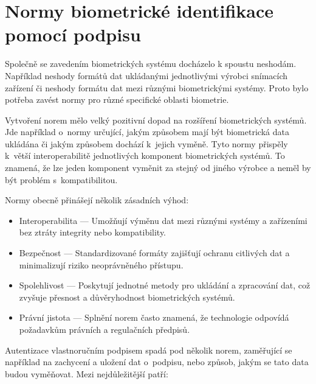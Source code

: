 \section{Normy biometrické identifikace pomocí podpisu}
Společně se zavedením biometrických systému docházelo k spoustu neshodám.
Například neshody formátů dat ukládanými jednotlivými výrobci snímacích zařízení či neshody formátu dat mezi různými biometrickými systémy.
Proto bylo potřeba zavést normy pro různé specifické oblasti biometrie.

Vytvoření norem mělo velký pozitivní dopad na rozšíření biometrických systémů.                                                %
Jde například o~normy určující, jakým způsobem mají být biometrická data ukládána či jakým způsobem dochází k~jejich vyměně.  %
Tyto normy přispěly k~větší interoperabilitě jednotlivých komponent biometrických systémů.                                    %
To znamená, že lze jeden komponent vyměnit za stejný od jiného výrobce a neměl by být problém s~kompatibilitou.~\cite{DrahanskýMartin2011}%
\newline 

\noindent
Normy obecně přinášejí několik zásadních výhod:
\begin{itemize}
  \item Interoperabilita --- Umožňují výměnu dat mezi různými systémy a zařízeními bez ztráty integrity nebo kompatibility.
  \item Bezpečnost --- Standardizované formáty zajišťují ochranu citlivých dat a minimalizují riziko neoprávněného přístupu.
  \item Spolehlivost --- Poskytují jednotné metody pro ukládání a zpracování dat, což zvyšuje přesnost a důvěryhodnost biometrických systémů.
  \item Právní jistota --- Splnění norem často znamená, že technologie odpovídá požadavkům právních a regulačních předpisů.
\end{itemize}

Autentizace vlastnoručním podpisem spadá pod několik norem, zaměřující se například na zachycení a uložení dat o~podpisu, nebo způsob, jakým se tato data budou vyměňovat. 
Mezi nejdůležitější patří:

